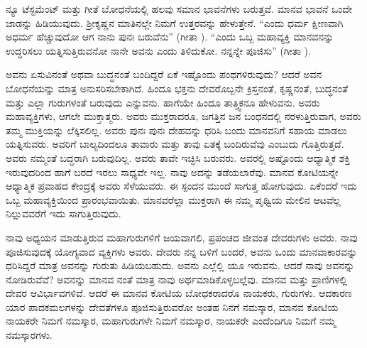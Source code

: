 ನ್ಯೂ ಟೆಸ್ಟಮೆಂಟ್​ ಮತ್ತು ಗೀತೆ ಬೋಧನೆಯಲ್ಲಿ ಹಲವು ಸಮಾನ ಭಾವನೆಗಳು ಬರುತ್ತವೆ. ಮಾನವ ಭಾವನೆ ಒಂದೇ ಜಾಡನ್ನು ಹಿಡಿಯುವುದು. ಶ‍್ರೀಕೃಷ್ಣನ ಮಾತಿನಲ್ಲೇ ನಿಮಗೆ ಉತ್ತರವನ್ನು ಹೇಳುತ್ತೇನೆ. “ಎಂದು ಧರ್ಮ ಕ್ಷೀಣವಾಗಿ ಅಧರ್ಮ ಹೆಚ್ಚುವುದೋ ಆಗ ನಾನು ಪುನಃ ಬರುವೆನು” (ಗೀತಾ ). “ಎಂದು ಒಬ್ಬ ಮಹಾವ್ಯಕ್ತಿ ಮಾನವನನ್ನು ಉದ್ಧರಿಸಲು ಯತ್ನಿಸುತ್ತಿರುವನೋ ನಾನೇ ಅವನು ಎಂದು ತಿಳಿದುಕೋ. ನನ್ನನ್ನೇ ಪೂಜಿಸು” (ಗೀತಾ ).

ಅವನು ಏಸುವಿನಂತೆ ಅಥವಾ ಬುದ್ಧನಂತೆ ಬಂದಿದ್ದರೆ ಏಕೆ ಇಷ್ಟೊಂದು ಪಂಥ\-ಗಳಿರುವುದು? ಆದರೆ ಅವನ ಬೋಧನೆಯನ್ನು ಮಾತ್ರ ಅನುಸರಿಸಬೇಕಾಗಿದೆ. ಹಿಂದೂ ಭಕ್ತನು ದೇವರೊಬ್ಬನೇ ಕ್ರಿಸ್ತನಂತೆ, ಕೃಷ್ಣನಂತೆ, ಬುದ್ಧನಂತೆ ಮತ್ತು ಎಲ್ಲಾ ಗುರುಗಳಂತೆ ಬರುವುದು ಎನ್ನುವನು. ಹಾಗೆಯೇ ಹಿಂದೂ ತಾತ್ತ್ವಿಕನೂ ಹೇಳುವನು. ಅವರು ಮಹಾವ್ಯಕ್ತಿಗಳು, ಆಗಲೇ ಮುಕ್ತಾತ್ಮರು. ಅವರು ಮುಕ್ತರಾದರೂ, ಜಗತ್ತಿನ ಜನ ಬಂಧನದಲ್ಲಿ ನರಳು\-ತ್ತಿರುವಾಗ, ಅವರು ತಮ್ಮ ಮುಕ್ತಿಯನ್ನು ಲೆಕ್ಕಿಸಲಿಲ್ಲ. ಅವರು ಪುನಃ ಪುನಃ ದೇಹವನ್ನು ಧರಿಸಿ ಬಂದು ಮಾನವನಿಗೆ ಸಹಾಯ ಮಾಡಲು ಯತ್ನಿಸುವರು. ಅವರಿಗೆ ಬಾಲ್ಯದಿಂದಲೂ ತಾವಾರು ಮತ್ತು ತಾವು ಏತಕ್ಕೆ ಬಂದಿರುವೆವು ಎಂಬುದು ಗೊತ್ತಿರುತ್ತದೆ. ಅವರು ನಮ್ಮಂತೆ ಬದ್ಧರಾಗಿ ಬರುವುದಿಲ್ಲ. ಅವರು ತಾವೇ ಇಚ್ಛಿಸಿ ಬರುವರು. ಅವರಲ್ಲಿ ಅಷ್ಟೊಂದು ಆಧ್ಯಾತ್ಮಿಕ ಶಕ್ತಿ ಇರುವುದರಿಂದ ಹಾಗೆ ಬರದೆ ಇರಲು ಸಾಧ್ಯವೇ ಇಲ್ಲ. ನಾವು ಅದನ್ನು ತಡೆಯಲಾರೆವು. ಮಾನವ ಕೋಟಿಯನ್ನೇ ಆಧ್ಯಾತ್ಮಿಕ ಪ್ರವಾಹದ ಕೇಂದ್ರಕ್ಕೆ ಅವರು ಸೆಳೆಯುವರು. ಈ ಸ್ಪಂದನ ಮುಂದೆ ಸಾಗುತ್ತ ಹೋಗುವುದು. ಏಕೆಂದರೆ ಇದು ಒಬ್ಬ ಮಹಾವ್ಯಕ್ತಿಯಿಂದ ಪ್ರಾರಂಭವಾಯಿತು. ಮಾನವರೆಲ್ಲಾ ಮುಕ್ತರಾಗಿ ಈ ನಮ್ಮ ಪೃಥ್ವಿಯ ಮೇಲಿನ ಆಟವೆಲ್ಲ ನಿಲ್ಲುವವರೆಗೆ ಇದು ಸಾಗುತ್ತಿರುವುದು.

ನಾವು ಅಧ್ಯಯನ ಮಾಡುತ್ತಿರುವ ಮಹಾಗುರುಗಳಿಗೆ ಜಯವಾಗಲಿ, ಪ್ರಪಂಚದ ಜೀವಂತ ದೇವರುಗಳು ಅವರು. ನಾವು ಪೂಜಿಸುವುದಕ್ಕೆ ಯೋಗ್ಯವಾದ ವ್ಯಕ್ತಿಗಳು ಅವರು. ದೇವರು ನನ್ನ ಬಳಿಗೆ ಬಂದರೆ, ಅವನು ಒಂದು ಮಾನವಾಕಾರವನ್ನು ಧರಿಸಿದ್ದರೆ ಮಾತ್ರ ಅವನನ್ನು ಗುರುತು ಹಿಡಿಯಬಹುದು. ಅವನು ಎಲ್ಲೆಲ್ಲಿ ಯೂ ಇರುವನು. ಆದರೆ ನಾವು ಅವನನ್ನು ನೋಡಿರುವೆವೆ? ಅವನನ್ನು ಮಾನವ ನಂತೆ ಮಾತ್ರ ನಾವು ಅರ್ಥಮಾಡಿಕೊಳ್ಳಬಲ್ಲೆವು. ಮಾನವ ಮತ್ತು ಪ್ರಾಣಿಗಳಲ್ಲಿ ದೇವರ ಆವಿರ್ಭಾವಗಳಿವೆ. ಆದರೆ ಈ ಮಾನವ ಕೋಟಿಯ ಬೋಧಕರಾದರೊ ನಾಯಕರು, ಗುರುಗಳು. ಆದಕಾರಣ ಯಾರ ಪಾದಕಮಲಗಳನ್ನು ದೇವತೆಗಳೂ ಪೂಜಿಸುತ್ತಿರುವರೋ ಅಂತಹ ನಿನಗೆ ನಮಸ್ಕಾರ, ಮಾನವ ಕೋಟಿಯ ನಾಯಕರೇ ನಿಮಗೆ ನಮಸ್ಕಾರ, ಮಹಾಗುರುಗಳೇ ನಿಮಗೆ ನಮಸ್ಕಾರ, ನಾಯಕರೇ ಎಂದೆಂದಿಗೂ ನಿಮಗೆ ನಮ್ಮ ನಮಸ್ಕಾರಗಳು.

